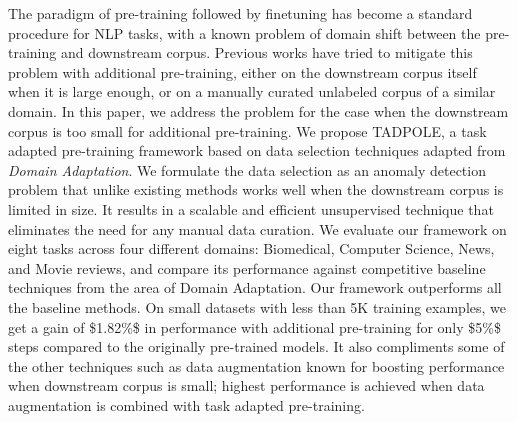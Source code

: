The paradigm of pre-training followed by finetuning has become a standard procedure for NLP tasks, with a known problem of domain shift between the pre-training and downstream corpus. Previous works have tried to mitigate this problem with additional pre-training, either on the downstream corpus itself when it is large enough, or on a manually curated unlabeled corpus of a similar domain. In this paper, we address the problem for the case when the downstream corpus is too small for additional pre-training. We propose TADPOLE, a task adapted pre-training framework based on data selection techniques adapted from {\em Domain Adaptation}. We formulate the data selection as an anomaly detection problem that unlike existing methods works well when the downstream corpus is limited in size. It results in a scalable and efficient unsupervised technique that eliminates the need for any manual data curation. We evaluate our framework on eight tasks across four different domains: Biomedical, Computer Science, News, and Movie reviews, and compare its performance against competitive baseline techniques from the area of Domain Adaptation. Our framework outperforms all the baseline methods. On small datasets with less than 5K training examples, we get a gain of \$1.82\%\$ in performance with additional pre-training for only \$5\%\$ steps compared to the originally pre-trained models. It also compliments some of the other techniques such as data augmentation known for boosting performance when downstream corpus is small; highest performance is achieved when data augmentation is combined with task adapted pre-training.
